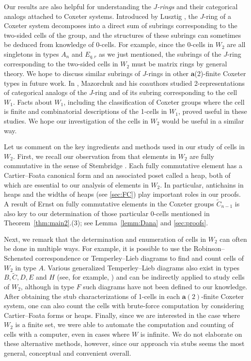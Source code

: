 \documentclass[ALCO,Unicode,published]{cedram}
\newcommand{\la}{\mathbf{a}}
\begin{document}
Our results are also helpful for understanding the \emph{$J$-rings} and their categorical analogs
attached to Coxeter systems. Introduced by Lusztig \cite{LusztigCellII, LusztigHecke}, the $J$-ring
of a Coxeter system decomposes into a direct sum of subrings corresponding to the two-sided cells of
the group, and the structures of these subrings can sometimes be deduced from knowledge of 0-cells.
For example, since the 0-cells in $W_2$ are all singletons in types $A_n$ and $E_{q,r}$ as we just
mentioned, the subrings of the $J$-ring corresponding to the two-sided cells in $W_2$ must be matrix
rings by general theory.  We hope to discuss similar subrings of $J$-rings in other $\la$(2)-finite
Coxeter types in future work.  In \cite{Mazorchuk1, Mazorchuk2, Mazorchuk3}, Mazorchuk and his
coauthors studied 2-representations of categorical analogs of the $J$-ring and of its subring
corresponding to the cell $W_1$.  Facts about $W_1$, including the classification of Coxeter groups
where the cell is finite and combinatorial descriptions of the 1-cells in $W_1$, proved useful in
these studies. We hope our investigation of the cells in $W_2$ would be useful in a similar way.  

Let us comment on the key ingredients and methods used in our study of cells in $W_2$. First, we
recall our observation from \cite{GreenXu} that elements in $W_2$ are {fully commutative} in the
sense of Stembridge \cite{FC}.  Each fully commutative element has a {Cartier--Foata canonical form}
and an associated poset called a {heap}, both of which are essential to our analysis of elements in
$W_2$. In particular, antichains in heaps and the {widths} of heaps (see \autoref{sec:FC}) play
important roles in our proofs. A result of Ernst on fully commutative elements in the Coxeter groups
$\tilde C_{n-1}$ is also key to our determination of those particular 0-cells mentioned in
Theorem~\ref{thm:main2}.(3); see Lemma~\ref{lemm:Dana} and \autoref{sec:proofs}. 

Next, we remark that the determination and enumeration of cells in $W_2$ can often be done in
multiple ways.  For example, it is possible to use the {Robinson--Schensted correspondence} or
{Temperley--Lieb diagrams} to find and count cells of $W_2$ in type $A$.  Various {generalized
Temperley--Lieb diagrams} also exist in types $B, \tilde C, D, E$ and $H$ (see, for example,
\cite{ErnstTL,GreenTangles}) and can be indirectly applied to study cells of $W_2$, although in type
$F$ such diagrams have not been defined to our knowledge.  After obtaining the stub
characterizations of 1-cells in each $\la(2)$-finite Coxeter system, one can also count the cells
with brute-force computation by considering Cartier--Foata forms or heaps. Finally, since we are
interested in the case where $W_2$ is a finite set, we were able to automate the computation and
counting of cells with a computer, even in cases where $W$ is infinite.  We do not elaborate on
these alternative methods, however, since our approach via stubs seems the most general, conceptual
and convenient overall.
\end{document}
